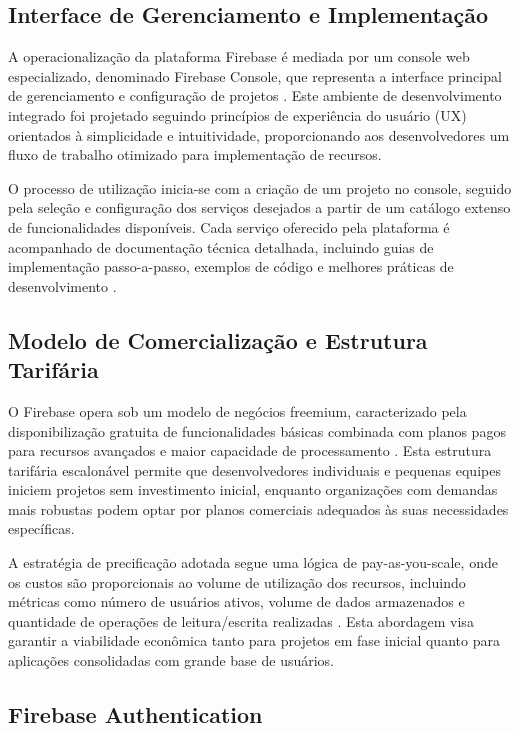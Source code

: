 \documentclass[
	12pt,				    %
	openright,			    %
	oneside,			    %
	a4paper,			    %
    sumario=tradicional,    %
	english,			    %
	brazil,				    %
	]{abntex2}              %
\begin{document}
\subsection{Interface de Gerenciamento e Implementação}

A operacionalização da plataforma Firebase é mediada por um console web especializado, denominado Firebase Console, que representa a interface principal de gerenciamento e configuração de projetos \cite{google2023console}. Este ambiente de desenvolvimento integrado foi projetado seguindo princípios de experiência do usuário (UX) orientados à simplicidade e intuitividade, proporcionando aos desenvolvedores um fluxo de trabalho otimizado para implementação de recursos.

O processo de utilização inicia-se com a criação de um projeto no console, seguido pela seleção e configuração dos serviços desejados a partir de um catálogo extenso de funcionalidades disponíveis. Cada serviço oferecido pela plataforma é acompanhado de documentação técnica detalhada, incluindo guias de implementação passo-a-passo, exemplos de código e melhores práticas de desenvolvimento \cite{firebase2023implementation}.

\subsection{Modelo de Comercialização e Estrutura Tarifária}

O Firebase opera sob um modelo de negócios freemium, caracterizado pela disponibilização gratuita de funcionalidades básicas combinada com planos pagos para recursos avançados e maior capacidade de processamento \cite{google2023pricing}. Esta estrutura tarifária escalonável permite que desenvolvedores individuais e pequenas equipes iniciem projetos sem investimento inicial, enquanto organizações com demandas mais robustas podem optar por planos comerciais adequados às suas necessidades específicas.

A estratégia de precificação adotada segue uma lógica de pay-as-you-scale, onde os custos são proporcionais ao volume de utilização dos recursos, incluindo métricas como número de usuários ativos, volume de dados armazenados e quantidade de operações de leitura/escrita realizadas \cite{moroney2022firebase}. Esta abordagem visa garantir a viabilidade econômica tanto para projetos em fase inicial quanto para aplicações consolidadas com grande base de usuários.

\subsection{Firebase Authentication}
\end{document}
